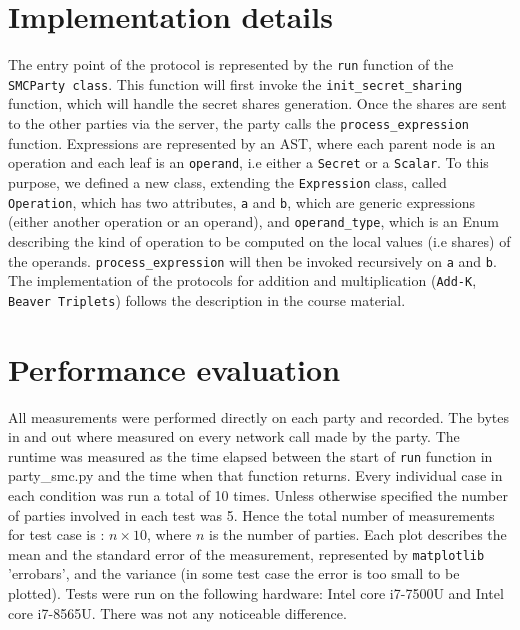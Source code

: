 \documentclass[10pt,conference,compsocconf]{IEEEtran}
\begin{document}
\section{Implementation details}
The entry point of the protocol is represented by the \texttt{run} function of the \texttt{SMCParty class}.
This function will first invoke the \texttt{init\_secret\_sharing} function, which will handle the secret shares generation.
Once the shares are sent to the other parties via the server, the party calls the \texttt{process\_expression} function.
Expressions are represented by an AST, where each parent node is an operation and each leaf is an \texttt{operand}, i.e either a \texttt{Secret} or a \texttt{Scalar}.
To this purpose, we defined a new class, extending the \texttt{Expression} class, called \texttt{Operation}, which has two attributes, \texttt{a} and \texttt{b},
which are generic expressions (either another operation or an operand), and \texttt{operand\_type}, which is an Enum describing the kind of operation to be computed on the local values (i.e shares)
of the operands. \texttt{process\_expression} will then be invoked recursively on \texttt{a} and \texttt{b}.
The implementation of the protocols for addition and multiplication (\texttt{Add-K}, \texttt{Beaver Triplets}) follows the description in the course material.

\section{Performance evaluation}
All measurements were performed directly on each party and recorded.
The bytes in and out where measured on every
network call made by the party.
The runtime was measured as the time elapsed between the start of \texttt{run} function in
party\_smc.py and the time when that function returns.
Every individual case in each condition was run a total of 10 times.
Unless otherwise specified the number of parties involved in each test was 5.
Hence the total number of measurements for test case is : $n \times 10$, where $n$ is the number of parties.
Each plot describes the mean and the standard error of the measurement, represented by \texttt{matplotlib} 'errobars', and the variance (in some test case the error is too small to be plotted).
Tests were run on the following hardware: Intel core i7-7500U and Intel core i7-8565U. There was not any noticeable difference.
\end{document}
